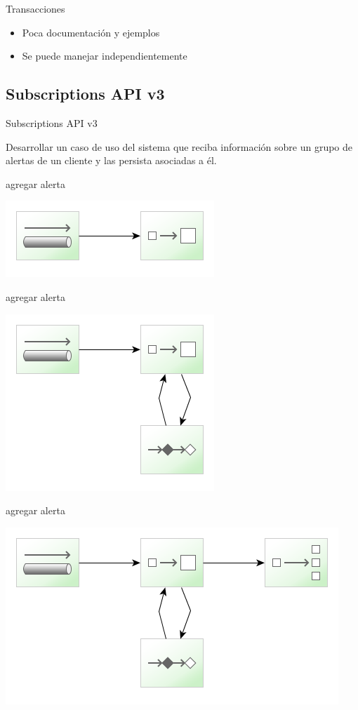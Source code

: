 \documentclass{beamer}
\begin{document}
\begin{frame}{Transacciones}
\begin{itemize}
\item Poca documentación y ejemplos
\item Se puede manejar independientemente
\end{itemize}
\end{frame}



\subsection{Subscriptions API v3}
\begin{frame}
\begin{center}
\Large{Subscriptions API v3}
\end{center}
Desarrollar un caso de uso del sistema que reciba información sobre un grupo de alertas de un cliente y las persista asociadas a él.
\end{frame}

\begin{frame}{agregar alerta}
\begin{center}
\includegraphics[width=0.4\linewidth]{sp-int-25}
\end{center}
\end{frame}

\begin{frame}{agregar alerta}
\begin{center}
\includegraphics[width=0.4\linewidth]{sp-int-26}
\end{center}
\end{frame}

\begin{frame}{agregar alerta}
\begin{center}
\includegraphics[width=0.6\linewidth]{sp-int-27}
\end{center}
\end{frame}
\end{document}
